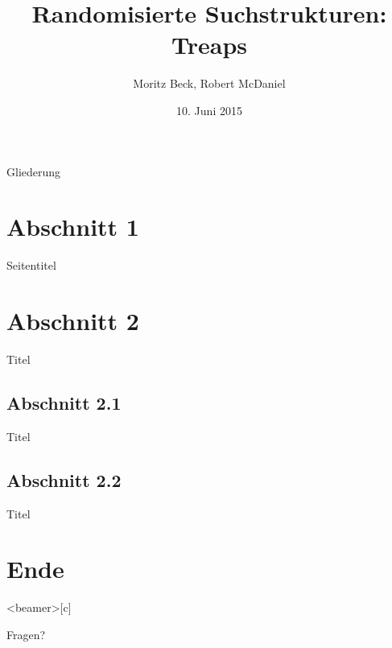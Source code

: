 \documentclass[t]{beamer}
\title[Trepas]{Randomisierte Suchstrukturen: Treaps}
\author[M. Beck, R.McDaniel]{Moritz Beck, Robert McDaniel}
\date[10.06.2015]{10. Juni 2015}
\theoremstyle{plain}
\begin{document}
{

\begin{frame}%
    \titlepage
\end{frame}

\begin{frame}{Gliederung}
    \tableofcontents
\end{frame}
}

\section{Abschnitt 1}
\begin{frame}{Seitentitel}
    
\end{frame}
\begin{frame}
    
\end{frame}

\section{Abschnitt 2}
\begin{frame}{Titel}
    
\end{frame}

\subsection{Abschnitt 2.1}
\begin{frame}{Titel}
    
\end{frame}

\subsection{Abschnitt 2.2}
\begin{frame}{Titel}
    
\end{frame}


\section*{Ende}
{
\begin{frame}<beamer>[c]
    \begin{center}
    \Huge{Fragen?}
    \end{center}
\end{frame}}
\end{document}
